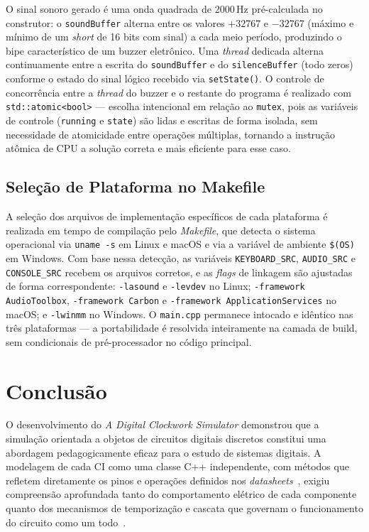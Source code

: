 \documentclass[12pt]{article}
\begin{document}
O sinal sonoro gerado é uma onda quadrada de 2000\,Hz pré-calculada no construtor: o \texttt{soundBuffer} alterna entre os valores $+32767$ e $-32767$ (máximo e mínimo de um \textit{short} de 16 bits com sinal) a cada meio período, produzindo o bipe característico de um buzzer eletrônico. Uma \textit{thread} dedicada alterna continuamente entre a escrita do \texttt{soundBuffer} e do \texttt{silenceBuffer} (todo zeros) conforme o estado do sinal lógico recebido via \texttt{setState()}. O controle de concorrência entre a \textit{thread} do buzzer e o restante do programa é realizado com \texttt{std::atomic<bool>} — escolha intencional em relação ao \texttt{mutex}, pois as variáveis de controle (\texttt{running} e \texttt{state}) são lidas e escritas de forma isolada, sem necessidade de atomicidade entre operações múltiplas, tornando a instrução atômica de CPU a solução correta e mais eficiente para esse caso.

\subsection{Seleção de Plataforma no Makefile}

A seleção dos arquivos de implementação específicos de cada plataforma é realizada em tempo de compilação pelo \textit{Makefile}, que detecta o sistema operacional via \texttt{uname -s} em Linux e macOS e via a variável de ambiente \texttt{\$(OS)} em Windows. Com base nessa detecção, as variáveis \texttt{KEYBOARD\_SRC}, \texttt{AUDIO\_SRC} e \texttt{CONSOLE\_SRC} recebem os arquivos corretos, e as \textit{flags} de linkagem são ajustadas de forma correspondente: \texttt{-lasound} e \texttt{-levdev} no Linux; \texttt{-framework AudioToolbox}, \texttt{-framework Carbon} e \texttt{-framework ApplicationServices} no macOS; e \texttt{-lwinmm} no Windows. O \texttt{main.cpp} permanece intocado e idêntico nas três plataformas — a portabilidade é resolvida inteiramente na camada de build, sem condicionais de pré-processador no código principal.

\section{Conclusão}

O desenvolvimento do \textit{A Digital Clockwork Simulator} demonstrou que a simulação orientada a objetos de circuitos digitais discretos constitui uma abordagem pedagogicamente eficaz para o estudo de sistemas digitais. A modelagem de cada CI como uma classe C++ independente, com métodos que refletem diretamente os pinos e operações definidos nos \textit{datasheets}~\cite{ti:cd4029,ti:cd4511,ti:cd4017,ti:cd4040,ti:cd4013,ti:cd4063,ti:cd4081,ti:cd4071}, exigiu compreensão aprofundada tanto do comportamento elétrico de cada componente quanto dos mecanismos de temporização e cascata que governam o funcionamento do circuito como um todo~\cite{tocci,floyd}.
\end{document}

